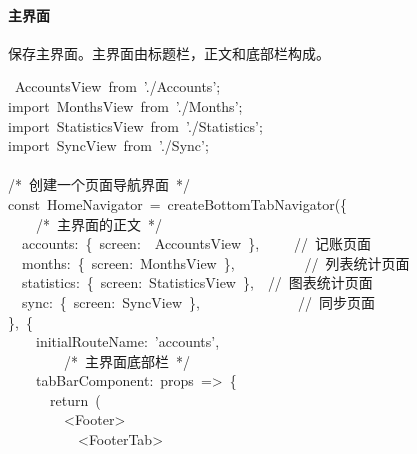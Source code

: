 \documentclass{article}
\begin{document}
\paragraph{主界面}\label{section}%

\noindent{}保存主界面。主界面由标题栏，正文和底部栏构成。%
\begin{mdpre}%
~AccountsView~{from}~{'}{./Accounts}{'};\\
{import}~MonthsView~{from}~{'}{./Months}{'};\\
{import}~StatisticsView~{from}~{'}{./Statistics}{'};\\
{import}~SyncView~{from}~{'}{./Sync}{'};\\
\\
{/*}{~创建一个页面导航界面~}{*/}\\
{const}~HomeNavigator~=~createBottomTabNavigator(\{\\
~~~~{/*}{~主界面的正文~}{*/}\\
~~accounts:~\{~screen:~~AccountsView~\},~~~~~{//~记账页面}\\
~~months:~\{~screen:~MonthsView~\},~~~~~~~~~~{//~列表统计页面}\\
~~statistics:~\{~screen:~StatisticsView~\},~~{//~图表统计页面}\\
~~sync:~\{~screen:~SyncView~\},~~~~~~~~~~~~~~{//~同步页面}\\
\},~\{\\
~~~~initialRouteName:~{'}{accounts}{'},\\
~~~~~~~~{/*}{~主界面底部栏~}{*/}\\
~~~~tabBarComponent:~props~=\textgreater{}~\{\\
~~~~~~{return}~(\\
~~~~~~~~\textless{}Footer\textgreater{}\\
~~~~~~~~~~\textless{}FooterTab\textgreater{}\\

\end{mdpre}
\end{document}
